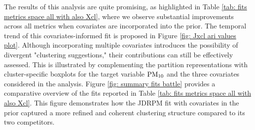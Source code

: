 \documentclass[12pt,	%
	a4paper,		%
	twoside,		%
	openright,		%
	titlepage,%
	]{book}
\theoremstyle{definition}
\begin{document}
The results of this analysis are quite promising, as highlighted in Table \ref{tab: fits metrics space all with also Xcl}, where we observe substantial improvements across all metrics when covariates are incorporated into the prior. The temporal trend of this covariates-informed fit is proposed in Figure \ref{fig: Jxcl ari values plot}. Although incorporating multiple covariates introduces the possibility of divergent "clustering suggestions," their contributions can still be effectively assessed. This is illustrated by complementing the partition representations with cluster-specific boxplots for the target variable $\text{PM}_{10}$ and the three covariates considered in the analysis. Figure \ref{fig: summary fits battle} provides a comparative overview of the fits reported in Table \ref{tab: fits metrics space all with also Xcl}. This figure demonstrates how the JDRPM fit with covariates in the prior captured a more refined and coherent clustering structure compared to its two competitors.
\end{document}
